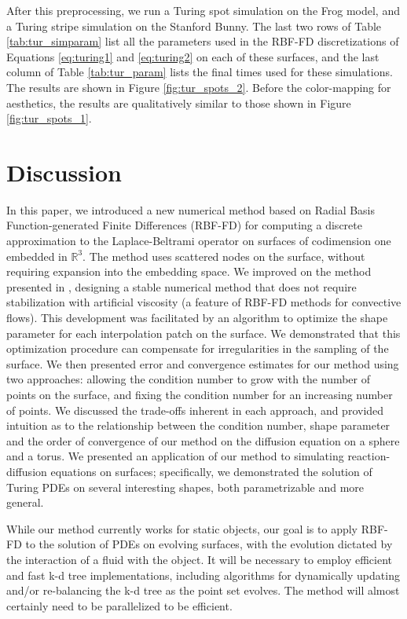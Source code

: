 \documentclass[smallextended]{svjour3}
\begin{document}
After this preprocessing, we run a Turing spot simulation on the Frog model, and a Turing stripe simulation on the Stanford Bunny. The last two rows of Table \ref{tab:tur_simparam} list all the parameters used in the RBF-FD discretizations of Equations \eqref{eq:turing1} and \eqref{eq:turing2} on each of these surfaces, and the last column of Table \ref{tab:tur_param} lists the final times used for these simulations. The results are shown in Figure \ref{fig:tur_spots_2}. Before the color-mapping for aesthetics, the results are qualitatively similar to those shown in Figure \ref{fig:tur_spots_1}.


 


\section{Discussion}
\label{sec:discuss}

In this paper, we introduced a new numerical method based on Radial Basis Function-generated Finite Differences (RBF-FD) for computing a discrete approximation to the Laplace-Beltrami operator on surfaces of codimension one embedded in $\mathbb{R}^3$. The method uses scattered nodes on the surface, without requiring expansion into the embedding space. We improved on the method presented in \cite{ShankarWrightEtAlIJNMF2013}, designing a stable numerical method that does not require stabilization with artificial viscosity (a feature of RBF-FD methods for convective flows). This development was facilitated by an algorithm to optimize the shape parameter for each interpolation patch on the surface. We demonstrated that this optimization procedure can compensate for irregularities in the sampling of the surface. We then presented error and convergence estimates for our method using two approaches: allowing the condition number to grow with the number of points on the surface, and fixing the condition number for an increasing number of points. We discussed the trade-offs inherent in each approach, and provided intuition as to the relationship between the condition number, shape parameter and the order of convergence of our method on the diffusion equation on a sphere and a torus. We presented an application of our method to simulating reaction-diffusion equations on surfaces; specifically, we demonstrated the solution of Turing PDEs on several interesting shapes, both parametrizable and more general.

While our method currently works for static objects, our goal is to apply RBF-FD to the solution of PDEs on evolving surfaces, with the evolution dictated by the interaction of a fluid with the object. It will be necessary to employ efficient and fast k-d tree implementations, including algorithms for dynamically updating and/or re-balancing the k-d tree as the point set evolves. The method will almost certainly need to be parallelized to be efficient.
\end{document}
